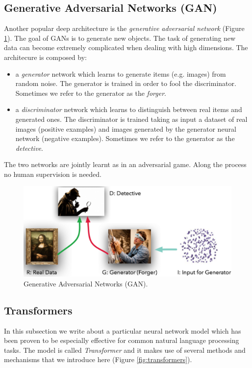\subsection{Generative Adversarial Networks (GAN)}
Another popular deep architecture is the \textit{generative adversarial network} (Figure \ref{fig:generative_adversarial_network}). The goal of GANs is to generate new objects. The task of generating new data can become extremely complicated when dealing with high dimensions. The architecure is composed by:
\begin{itemize}
    \item a \textit{generator} network which learns to generate items (e.g. images) from random noise. The generator is trained in order to fool the discriminator. Sometimes we refer to the generator as the \textit{forger}.
    
    \item a \textit{discriminator} network which learns to distinguish between real items and generated ones. The discriminator is trained taking as input a dataset of real images (positive examples) and images generated by the generator neural network (negative examples). Sometimes we refer to the generator as the \textit{detective}.
\end{itemize}
The two networks are jointly learnt as in an adversarial game. Along the process no human supervision is needed.

\begin{figure}
    \centering
    \includegraphics[width=\textwidth]{images/gan.png}
    \caption{Generative Adversarial Networks (GAN).}
    \label{fig:generative_adversarial_network}
\end{figure}

\subsection{Transformers}
In this subsection we write about a particular neural network model which has been proven to be especially effective for common natural language processing tasks. The model is called \textit{Transformer} and it makes use of several methods and mechanisms that we introduce here (Figure \ref{fig:transformers}).

